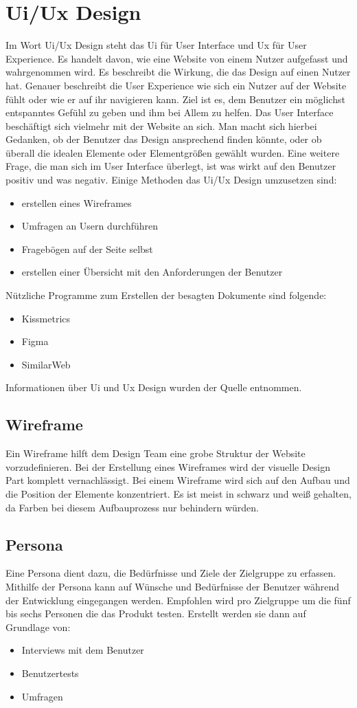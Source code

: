 \section{Ui/Ux Design}
Im Wort Ui/Ux Design steht das Ui für User Interface und Ux für User Experience. Es handelt davon, wie eine Website von einem Nutzer aufgefasst und wahrgenommen wird. Es beschreibt die Wirkung, die das Design auf einen Nutzer hat. Genauer beschreibt die User Experience wie sich ein Nutzer auf der Website fühlt oder wie er auf ihr navigieren kann. 
Ziel ist es, dem Benutzer ein möglichst entspanntes Gefühl zu geben und ihm bei Allem zu helfen. Das User Interface beschäftigt sich vielmehr mit der Website an sich. Man macht sich hierbei Gedanken, ob der Benutzer das Design ansprechend finden könnte, oder ob überall die idealen Elemente oder Elementgrößen gewählt wurden. Eine weitere Frage, die man sich im User Interface überlegt, ist was wirkt auf den Benutzer positiv und was negativ. Einige Methoden das Ui/Ux Design umzusetzen sind: 

\begin{itemize}
	\item erstellen eines Wireframes 
	\item Umfragen an Usern durchführen
	\item Fragebögen auf der Seite selbst 
	\item erstellen einer Übersicht mit den Anforderungen der Benutzer
\end{itemize}
Nützliche Programme zum Erstellen der besagten Dokumente  sind folgende: 
\begin{itemize}
	\item Kissmetrics
	\item Figma
	\item SimilarWeb
\end{itemize}
Informationen über Ui und Ux Design wurden der Quelle \cite{UI} entnommen.

\subsection{Wireframe}
Ein Wireframe hilft dem Design Team eine grobe Struktur der Website vorzudefinieren. Bei der Erstellung eines Wireframes wird der visuelle Design Part komplett vernachlässigt. Bei einem Wireframe wird sich auf den Aufbau und die Position der Elemente konzentriert. Es ist meist in schwarz und weiß gehalten, da Farben bei diesem Aufbauprozess nur behindern würden. 
\subsection{Persona}
Eine Persona dient dazu, die Bedürfnisse und Ziele der Zielgruppe zu erfassen. Mithilfe der Persona kann auf Wünsche und Bedürfnisse der Benutzer während der Entwicklung eingegangen werden. Empfohlen wird pro Zielgruppe um die fünf bis sechs Personen die das Produkt testen. Erstellt werden sie dann auf Grundlage von:
\begin{itemize}
	\item Interviews mit dem Benutzer
	\item Benutzertests
	\item Umfragen
\end{itemize}

